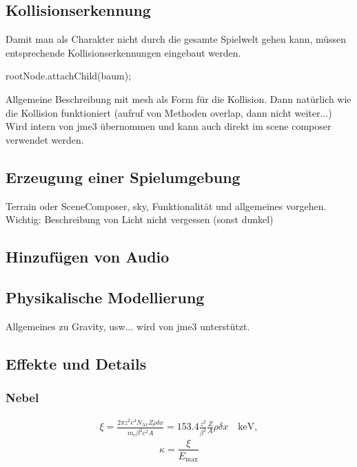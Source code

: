 \subsection{Kollisionserkennung}
Damit man als Charakter nicht durch die gesamte Spielwelt gehen kann, müssen entsprechende Kollisionserkennungen eingebaut werden. 
\begin{center}
	{rootNode.attachChild(baum);}
\end{center}
Allgemeine Beschreibung mit mesh als Form für die Kollision. Dann natürlich wie die Kollision funktioniert (aufruf von Methoden overlap, dann nicht weiter...)
Wird intern von jme3 übernommen und kann auch direkt im scene composer verwendet werden.

\subsection{Erzeugung einer Spielumgebung}
Terrain oder SceneComposer, sky, 
Funktionalität und allgemeines vorgehen.
Wichtig: Beschreibung von Licht nicht vergessen (sonst dunkel)

\subsection{Hinzufügen von Audio}

\subsection{Physikalische Modellierung}
Allgemeines zu Gravity, usw... wird von jme3 unterstützt.

\subsection{Effekte und Details}

\subsubsection{Nebel}
\begin{eqnarray*} \xi  = \frac{2\pi z^2 e^4 N_{\textrm{Av}} Z \rho
		\delta x}{m_{\textrm{e}} \beta^2 c^2 A} =  153.4 \frac{z^2}{\beta^2}
	\frac{Z}{A}
	\rho \delta x \quad\textrm{keV},
\end{eqnarray*}
\cite{Cr14}
\bigskip
\begin{equation}
\kappa =\frac{\xi}{E_{\textrm{max}}} %
\end{equation}


